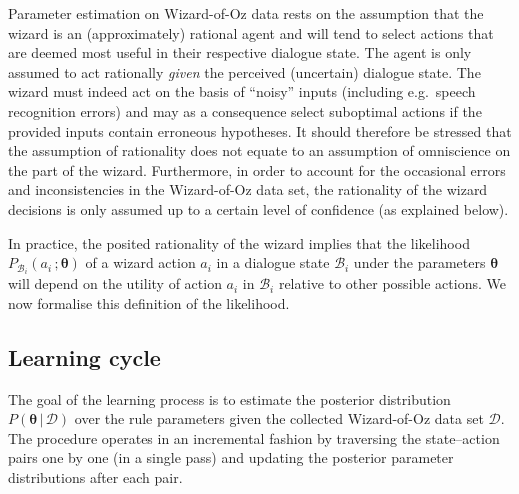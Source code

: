 Parameter estimation on Wizard-of-Oz data rests on the assumption that the wizard is an (approximately) rational agent and will tend to select actions that are deemed most useful in their respective dialogue state. The agent is only assumed to act rationally \textit{given} the perceived (uncertain) dialogue state. The wizard must indeed act on the basis of ``noisy'' inputs (including e.g.\ speech recognition errors) and may as a consequence select suboptimal actions if the provided inputs contain erroneous hypotheses. It should therefore be stressed that the assumption of rationality does not equate to an assumption of omniscience on the part of the wizard.  Furthermore, in order to account for the occasional errors and inconsistencies in the Wizard-of-Oz data set, the rationality of the wizard decisions is only assumed up to a certain level of confidence (as explained below). 

In practice, the posited rationality of the wizard implies that the likelihood $P_{\mathcal{B}_i}(a_i\,; \boldsymbol\theta)$ of a wizard action $a_i$ in a dialogue state $\mathcal{B}_i$ under the parameters $\boldsymbol\theta$ will depend on the utility of action $a_i$ in $\mathcal{B}_i$ relative to other possible actions.  We now formalise this definition of the likelihood.

\subsection{Learning cycle}
\label{sec:rule-supervised-learning}

The goal of the learning process is to estimate the posterior distribution $P(\boldsymbol\theta \, | \, \mathcal{D})$ over the rule parameters given the collected Wizard-of-Oz data set $\mathcal{D}$. The procedure operates in an incremental fashion by traversing the state--action pairs one by one (in a single pass) and updating the posterior parameter distributions after each pair.  

